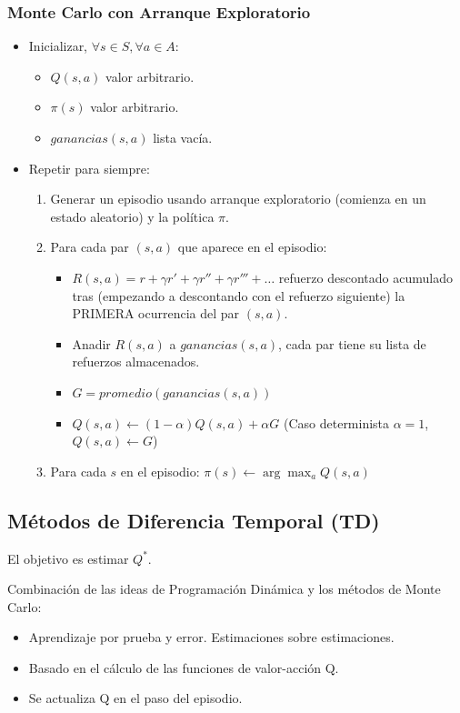 \documentclass[12pt]{report} %
\begin{document}
\subsubsection{Monte Carlo con Arranque Exploratorio}
\begin{itemize}
  \item Inicializar, $\forall s \in S, \forall a \in A$:
  \begin{itemize}
    \item $Q(s, a)$ valor arbitrario.
    \item $\pi(s)$ valor arbitrario.
    \item $ganancias(s, a)$ lista vacía.
  \end{itemize}
  \item Repetir para siempre:
  \begin{enumerate}
    \item Generar un episodio usando arranque exploratorio (comienza en un estado aleatorio) y la política $\pi$.
    \item Para cada par $(s, a)$ que aparece en el episodio:
    \begin{itemize}
      \item $R(s, a) = r + \gamma r'+ \gamma r''+ \gamma r'''+\dots$ refuerzo descontado acumulado tras (empezando a descontando con el refuerzo siguiente) la PRIMERA ocurrencia del par $(s, a)$. 
      \item Anadir $R(s, a)$ a $ganancias(s, a)$, cada par tiene su lista de refuerzos almacenados.
      \item $G = promedio(ganancias(s, a))$
      \item $Q(s, a) \leftarrow (1-\alpha)Q(s, a) + \alpha G$ (Caso determinista $\alpha = 1$, $Q(s, a) \leftarrow G$)
    \end{itemize}
    \item Para cada $s$ en el episodio: $\pi(s) \leftarrow \arg \max_a Q(s, a)$
  \end{enumerate}
\end{itemize}

\subsection{Métodos de Diferencia Temporal (TD)}
El objetivo es estimar $Q^*$.

Combinación de las ideas de Programación Dinámica y los métodos de Monte Carlo:
\begin{itemize}
  \item Aprendizaje por prueba y error. Estimaciones sobre estimaciones.
  \item Basado en el cálculo de las funciones de valor-acción Q.
  \item Se actualiza Q en el paso del episodio.
\end{itemize}
\end{document}
